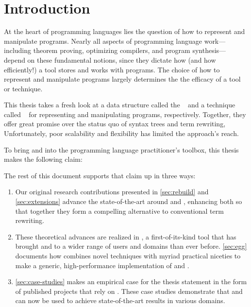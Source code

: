 \chapter{Introduction}
\label{sec:intro}

At the heart of programming languages
 lies the question of how to represent and manipulate programs.
Nearly all aspects of programming language work---including
 theorem proving, optimizing compilers, and program synthesis---%
 depend on these fundamental notions,
 since they dictate
 how (and how efficiently!) a tool
 stores and works with programs.
The choice of how to represent and manipulate programs
 largely determines the the efficacy of a tool or technique.

This thesis takes a fresh look at a data structure called the
 \textit{\egraph}~\cite{nelson}
 and a technique called \textit{\eqsat}~\cite{eqsat}
 for representing and manipulating programs, respectively.
Together,
 they offer great promise over the status quo of
 syntax trees and term rewriting,
Unfortunately,
 poor scalability and flexibility
 has limited the approach's reach.

To bring \egraphs and \eqsat into
 the programming language practitioner's toolbox,
 this thesis makes the following claim:
\begin{quote}
    \it\Thesisstmt
\end{quote}

The rest of this document
 supports that claim up in
 three ways:
\begin{enumerate}
\item
Our original research contributions presented in
 \autoref{sec:rebuild} and \autoref{sec:extensions}
 advance the state-of-the-art around
 \egraphs and \eqsat,
 enhancing both so that together they form a compelling
 alternative to conventional term rewriting.
\item
These theoretical advances
 are realized in \egg,
 a first-of-its-kind tool
 that has brought \egraphs and \eqsat
 to a wider range of users and domains than ever before.
\autoref{sec:egg} documents how \egg
 combines novel techniques with myriad practical niceties
 to make a generic, high-performance implementation of
 \egraphs and \eqsat.
\item
\autoref{sec:case-studies}
 makes an empirical case for the thesis statement
 in the form of published projects that rely on \egg.
These case studies demonstrate that \egraphs and \eqsat
 can now be used to
 achieve state-of-the-art results in various domains.
\end{enumerate}

